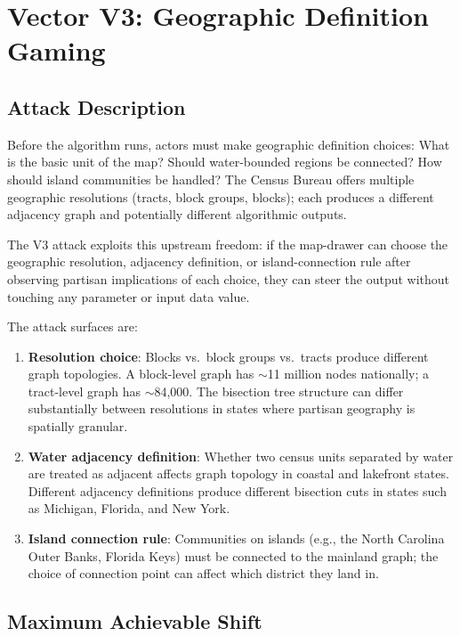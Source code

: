 \section{Vector V3: Geographic Definition Gaming}
\label{sec:v3}

\subsection{Attack Description}

Before the algorithm runs, actors must make geographic definition choices:
What is the basic unit of the map?
Should water-bounded regions be connected?
How should island communities be handled?
The Census Bureau offers multiple geographic resolutions (tracts, block groups,
blocks); each produces a different adjacency graph and potentially different
algorithmic outputs.

The V3 attack exploits this upstream freedom: if the map-drawer can choose
the geographic resolution, adjacency definition, or island-connection rule
after observing partisan implications of each choice, they can steer the
output without touching any parameter or input data value.

The attack surfaces are:
\begin{enumerate}
\item \textbf{Resolution choice}: Blocks vs.\ block groups vs.\ tracts
  produce different graph topologies.
  A block-level graph has $\sim$11 million nodes nationally; a tract-level
  graph has $\sim$84,000.
  The bisection tree structure can differ substantially between resolutions
  in states where partisan geography is spatially granular.
\item \textbf{Water adjacency definition}: Whether two census units separated
  by water are treated as adjacent affects graph topology in coastal and
  lakefront states.
  Different adjacency definitions produce different bisection cuts in
  states such as Michigan, Florida, and New York.
\item \textbf{Island connection rule}: Communities on islands (e.g., the
  North Carolina Outer Banks, Florida Keys) must be connected to the
  mainland graph; the choice of connection point can affect which district
  they land in.
\end{enumerate}

\subsection{Maximum Achievable Shift}

